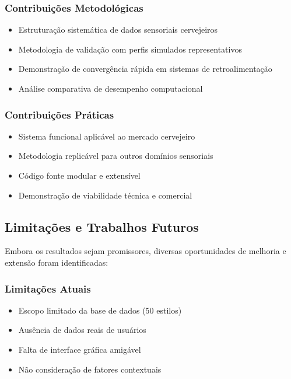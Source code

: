 \documentclass[12pt,a4paper]{article}
\begin{document}
\subsubsection{Contribuições Metodológicas}

\begin{itemize}
\item Estruturação sistemática de dados sensoriais cervejeiros
\item Metodologia de validação com perfis simulados representativos
\item Demonstração de convergência rápida em sistemas de retroalimentação
\item Análise comparativa de desempenho computacional
\end{itemize}

\subsubsection{Contribuições Práticas}

\begin{itemize}
\item Sistema funcional aplicável ao mercado cervejeiro
\item Metodologia replicável para outros domínios sensoriais
\item Código fonte modular e extensível
\item Demonstração de viabilidade técnica e comercial
\end{itemize}

\subsection{Limitações e Trabalhos Futuros}

Embora os resultados sejam promissores, diversas oportunidades de melhoria e extensão foram identificadas:

\subsubsection{Limitações Atuais}

\begin{itemize}
\item Escopo limitado da base de dados (50 estilos)
\item Ausência de dados reais de usuários
\item Falta de interface gráfica amigável
\item Não consideração de fatores contextuais
\end{itemize}
\end{document}
